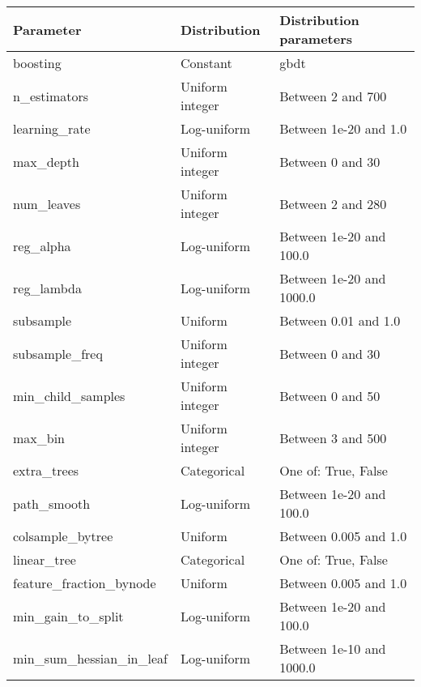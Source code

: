 \begin{tabular}{lll}
\toprule
              Parameter &    Distribution &  Distribution parameters \\
\midrule
               boosting &        Constant &                     gbdt \\
           n\_estimators & Uniform integer &        Between 2 and 700 \\
          learning\_rate &     Log-uniform &    Between 1e-20 and 1.0 \\
              max\_depth & Uniform integer &         Between 0 and 30 \\
             num\_leaves & Uniform integer &        Between 2 and 280 \\
              reg\_alpha &     Log-uniform &  Between 1e-20 and 100.0 \\
             reg\_lambda &     Log-uniform & Between 1e-20 and 1000.0 \\
              subsample &         Uniform &     Between 0.01 and 1.0 \\
         subsample\_freq & Uniform integer &         Between 0 and 30 \\
      min\_child\_samples & Uniform integer &         Between 0 and 50 \\
                max\_bin & Uniform integer &        Between 3 and 500 \\
            extra\_trees &     Categorical &      One of: True, False \\
            path\_smooth &     Log-uniform &  Between 1e-20 and 100.0 \\
       colsample\_bytree &         Uniform &    Between 0.005 and 1.0 \\
            linear\_tree &     Categorical &      One of: True, False \\
feature\_fraction\_bynode &         Uniform &    Between 0.005 and 1.0 \\
      min\_gain\_to\_split &     Log-uniform &  Between 1e-20 and 100.0 \\
min\_sum\_hessian\_in\_leaf &     Log-uniform & Between 1e-10 and 1000.0 \\
\bottomrule
\end{tabular}
